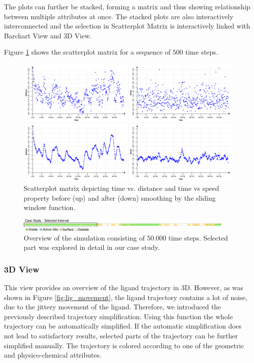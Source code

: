 \documentclass[twocolumn]{bmcart}%
\begin{document}
The plots can further be stacked, forming a matrix and thus showing relationship between multiple attributes at once.
The stacked plots are also interactively interconnected and the selection in Scatterplot Matrix is interactively linked with Barchart View and 3D View.

Figure \ref{fig:scatterplot} shows the scatterplot matrix for a sequence of $500$ time steps.

\begin{figure}[htb]
	\centering
  \includegraphics[width=0.95\linewidth]{img/scatterplot.png}
  \caption{\label{fig:scatterplot} Scatterplot matrix depicting time vs. distance and time vs speed property before (up) and after (down) smoothing by the sliding window function.}
\end{figure}

\begin{figure}[htb]
	\centering
  \includegraphics[width=0.95\textwidth]{img/case_overview.pdf}
  \caption{\label{fig:case_overview} Overview of the simulation consisting of $50.000$ time steps. Selected part was explored in detail in our case study.}
\end{figure}

\subsubsection*{3D View}
This view provides an overview of the ligand trajectory in 3D.
However, as was shown in Figure \ref{fig:lig_movement}, the ligand trajectory contains a lot of noise, due to the jittery movement of the ligand.
Therefore, we introduced the previously described trajectory simplification.
Using this function the whole trajectory can be automatically simplified.
If the automatic simplification does not lead to satisfactory results, selected parts of the trajectory can be further simplified manually.
The trajectory is colored according to one of the geometric and physico-chemical attributes. 
\end{document}
